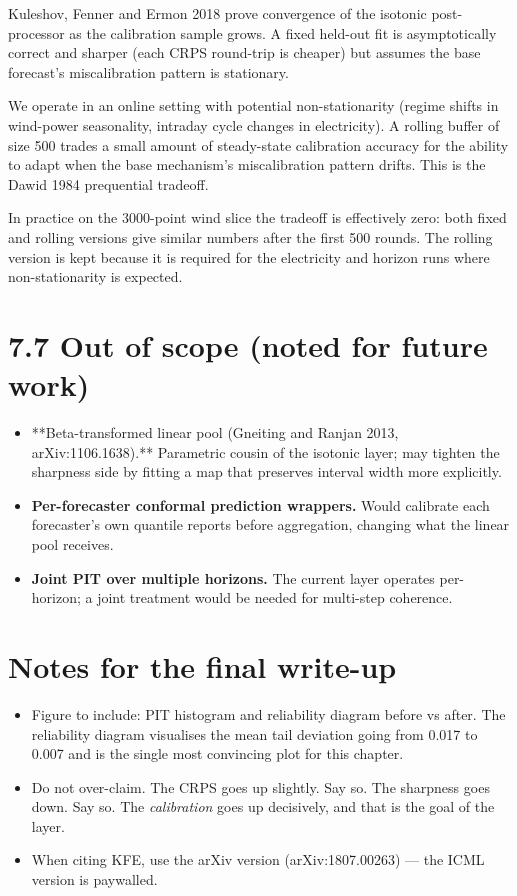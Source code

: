 \documentclass[11pt,a4paper,openany]{report}
\begin{document}
Kuleshov, Fenner and Ermon 2018 prove convergence of the isotonic
post-processor as the calibration sample grows. A fixed held-out fit
is asymptotically correct and sharper (each CRPS round-trip is cheaper)
but assumes the base forecast's miscalibration pattern is stationary.

We operate in an online setting with potential non-stationarity
(regime shifts in wind-power seasonality, intraday cycle changes in
electricity). A rolling buffer of size 500 trades a small amount of
steady-state calibration accuracy for the ability to adapt when the
base mechanism's miscalibration pattern drifts. This is the Dawid 1984
prequential tradeoff.

In practice on the 3000-point wind slice the tradeoff is effectively
zero: both fixed and rolling versions give similar numbers after the
first 500 rounds. The rolling version is kept because it is required
for the electricity and horizon runs where non-stationarity is
expected.

\section{7.7 Out of scope (noted for future work)}

\begin{itemize}
  \item **Beta-transformed linear pool (Gneiting and Ranjan 2013,
    arXiv:1106.1638).** Parametric cousin of the isotonic layer; may
    tighten the sharpness side by fitting a map that preserves interval
    width more explicitly.
  \item \textbf{Per-forecaster conformal prediction wrappers.} Would calibrate
    each forecaster's own quantile reports before aggregation, changing
    what the linear pool receives.
  \item \textbf{Joint PIT over multiple horizons.} The current layer operates
    per-horizon; a joint treatment would be needed for multi-step
    coherence.
\end{itemize}

\section{Notes for the final write-up}

\begin{itemize}
  \item Figure to include: PIT histogram and reliability diagram before vs
    after. The reliability diagram visualises the mean tail deviation
    going from 0.017 to 0.007 and is the single most convincing plot
    for this chapter.
  \item Do not over-claim. The CRPS goes up slightly. Say so. The sharpness
    goes down. Say so. The \emph{calibration} goes up decisively, and that
    is the goal of the layer.
  \item When citing KFE, use the arXiv version (arXiv:1807.00263) — the
    ICML version is paywalled.
\end{itemize}
\end{document}
